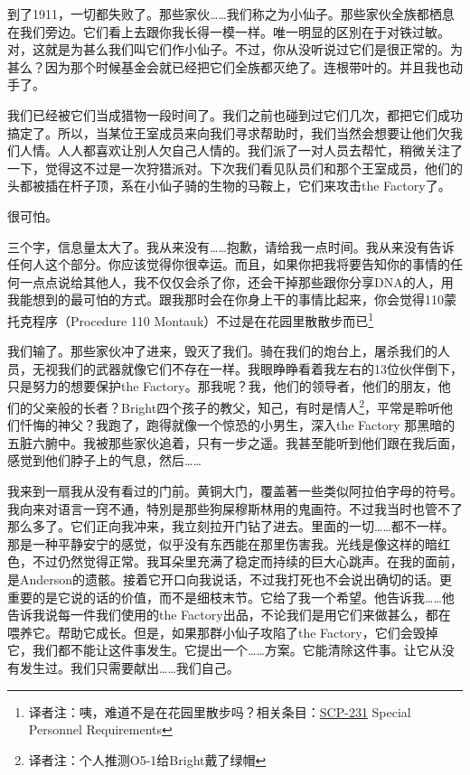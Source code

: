 \documentclass[openany,a4paper]{book} %
\begin{document}
到了1911，一切都失败了。那些家伙……我们称之为小仙子。那些家伙全族都栖息在我们旁边。它们看上去跟你我长得一模一样。唯一明显的区別在于对铁过敏。对，这就是为甚么我们叫它们作小仙子。不过，你从没听说过它们是很正常的。为甚么？因为那个时候基金会就已经把它们全族都灭绝了。连根带叶的。并且我也动手了。\vspace{12pt}

我们已经被它们当成猎物一段时间了。我们之前也碰到过它们几次，都把它们成功搞定了。所以，当某位王室成员来向我们寻求帮助时，我们当然会想要让他们欠我们人情。人人都喜欢让別人欠自己人情的。我们派了一对人员去帮忙，稍微关注了一下，觉得这不过是一次狩猎派对。下次我们看见队员们和那个王室成员，他们的头都被插在杆子顶，系在小仙子骑的生物的马鞍上，它们来攻击the Factory了。\vspace{12pt}

很可怕。\vspace{12pt}

三个字，信息量太大了。我从来没有……抱歉，请给我一点时间。我从来没有告诉任何人这个部分。你应该觉得你很幸运。而且，如果你把我将要告知你的事情的任何一点点说给其他人，我不仅仅会杀了你，还会干掉那些跟你分享DNA的人，用我能想到的最可怕的方式。跟我那时会在你身上干的事情比起来，你会觉得110蒙托克程序（Procedure 110 Montauk）不过是在花园里散散步而已\footnote{译者注：咦，难道不是在花园里散步吗？相关条目：\hyperref[chap:SCP-231]{SCP-231} Special Personnel Requirements}\vspace{12pt}

我们输了。那些家伙冲了进来，毁灭了我们。骑在我们的炮台上，屠杀我们的人员，无视我们的武器就像它们不存在一样。我眼睁睁看着我左右的13位伙伴倒下，只是努力的想要保护the Factory。那我呢？我，他们的领导者，他们的朋友，他们的父亲般的长者？Bright四个孩子的教父，知己，有时是情人\footnote{译者注：个人推测O5-1给Bright戴了绿帽}，平常是聆听他们忏悔的神父？我跑了，跑得就像一个惊恐的小男生，深入the Factory 那黑暗的五脏六腑中。我被那些家伙追着，只有一步之遥。我甚至能听到他们跟在我后面，感觉到他们脖子上的气息，然后……\vspace{12pt}

我来到一扇我从没有看过的门前。黄铜大门，覆盖著一些类似阿拉伯字母的符号。我向来对语言一窍不通，特別是那些狗屎穆斯林用的鬼画符。不过我当时也管不了那么多了。它们正向我冲来，我立刻拉开门钻了进去。里面的一切……都不一样。那是一种平静安宁的感觉，似乎没有东西能在那里伤害我。光线是像这样的暗红色，不过仍然觉得正常。我耳朵里充满了稳定而持续的巨大心跳声。在我的面前，是Anderson的遗骸。接着它开口向我说话，不过我打死也不会说出确切的话。更重要的是它说的话的价值，而不是细枝末节。它给了我一个希望。他告诉我……他告诉我说每一件我们使用的the Factory出品，不论我们是用它们来做甚么，都在喂养它。帮助它成长。但是，如果那群小仙子攻陷了the Factory，它们会毁掉它，我们都不能让这件事发生。它提出一个……方案。它能清除这件事。让它从没有发生过。我们只需要献出……我们自己。\vspace{12pt}
\end{document}

